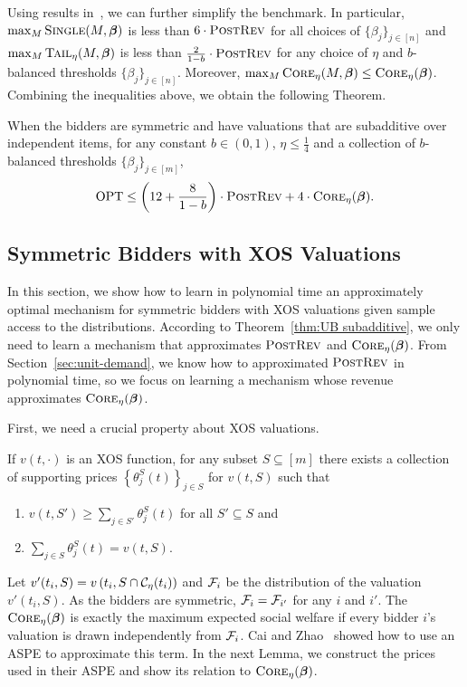  
Using results in~\cite{CaiZ17}, we can further simplify the benchmark. In particular, $\max_{M}\textsc{Single}(M,\boldsymbol{\beta})$ is less than $6\cdot\textsc{PostRev}$ for all choices of $\{\beta_j\}_{j\in[n]}$ and $\max_{M}\textsc{Tail}_\eta(M,\boldsymbol{\beta})$ is less than $\frac{2}{1-b}\cdot\textsc{PostRev}$ for any choice of $\eta$ and $b$-balanced thresholds $\{\beta_j\}_{j\in[n]}$. Moreover, $\max_{M}\textsc{Core}_\eta(M,\boldsymbol{\beta})\leq \textsc{Core}_\eta(\boldsymbol{\beta})$. Combining the inequalities above, we obtain the following Theorem.
\begin{theorem}\label{thm:UB subadditive}
	When the bidders are symmetric and have valuations that are subadditive over independent items, for any constant $b\in (0,1)$, $\eta\leq \frac{1}{4}$ and a collection of $b$-balanced thresholds $\{\beta_j\}_{j\in[m]}$, $$\text{OPT} \leq \left(12+\frac{8}{1-b}\right)\cdot \textsc{PostRev} + 4\cdot\textsc{Core}_\eta(\boldsymbol{\beta}).$$
\end{theorem}


\subsection{Symmetric Bidders with XOS Valuations}\label{sec:symmetric XOS}
In this section, we show how to learn in polynomial time an approximately optimal mechanism for symmetric bidders with XOS valuations given sample access to the distributions. According to Theorem~\ref{thm:UB subadditive}, we only need to learn a mechanism that approximates $\textsc{PostRev}$ and $\textsc{Core}_\eta(\boldsymbol{\beta})$. From Section~\ref{sec:unit-demand}, we know how to approximated $\textsc{PostRev}$ in polynomial time, so we focus on learning a mechanism whose revenue  approximates $\textsc{Core}_\eta(\boldsymbol{\beta})$. 

First, we need a crucial property about XOS valuations.

\begin{lemma}\label{lem:supporting price}
If $v(t,\cdot)$ is an XOS function, for any subset $S\subseteq[m]$ there exists a collection of supporting prices $\left\{\theta^{S}_j (t)\right\}_{j\in S}$ for $v(t,S)$ such that\begin{enumerate}
	\item $v(t,S') \geq \sum_{j\in S'} \theta^{S}_j (t)$ for all $S'\subseteq S$ and
	\item $\sum_{j\in S}\theta^{S}_j (t) = {v(t,S)}$.
\end{enumerate}
\end{lemma}

Let $v'(t_i,S)=v\left(t_i,S\cap {\mathcal{C}}_{\eta}(t_i)\right)$ and ${\mathcal{F}}_i$ be the distribution of the valuation $v'(t_i,S)$. As the bidders are symmetric, ${\mathcal{F}}_i={\mathcal{F}}_{i'}$ for any $i$ and $i'$. The $\textsc{Core}_\eta(\boldsymbol{\beta})$ is exactly the maximum expected social welfare if every bidder $i$'s valuation is drawn independently from ${\mathcal{F}}_i$. Cai and Zhao~\cite{CaiZ17} showed how to use an ASPE to approximate this term. In the next Lemma, we construct the prices used in their ASPE and show its relation to $\textsc{Core}_\eta(\boldsymbol{\beta})$.


